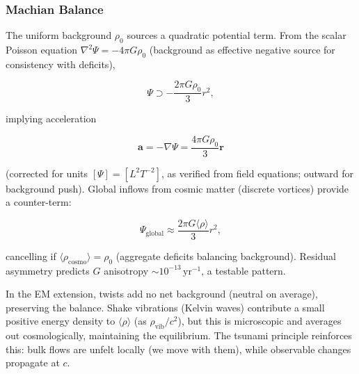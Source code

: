 \subsubsection{Machian Balance}
The uniform background $\rho_0$ sources a quadratic potential term. From the scalar Poisson equation $\nabla^2 \Psi = -4\pi G \rho_0$ (background as effective negative source for consistency with deficits),

\begin{equation}
\Psi \supset -\frac{2\pi G \rho_0}{3} r^2,
\end{equation}

implying acceleration

\begin{equation}
\mathbf{a} = -\nabla \Psi = \frac{4\pi G \rho_0}{3} \mathbf{r}
\end{equation}

(corrected for units $[\Psi] = [L^2 T^{-2}]$, as verified from field equations; outward for background push). Global inflows from cosmic matter (discrete vortices) provide a counter-term:

\begin{equation}
\Psi_{\text{global}} \approx \frac{2\pi G \langle \rho \rangle}{3} r^2,
\end{equation}

cancelling if $\langle \rho_\text{cosmo} \rangle = \rho_0$ (aggregate deficits balancing background). Residual asymmetry predicts $G$ anisotropy $\sim 10^{-13} \,\mathrm{yr}^{-1}$, a testable pattern.

In the EM extension, twists add no net background (neutral on average), preserving the balance. Shake vibrations (Kelvin waves) contribute a small positive energy density to $\langle \rho \rangle$ (as $\rho_{\text{vib}} / c^2$), but this is microscopic and averages out cosmologically, maintaining the equilibrium. The tsunami principle reinforces this: bulk flows are unfelt locally (we move with them), while observable changes propagate at $c$.

\medskip
\noindent
{}
\medskip

